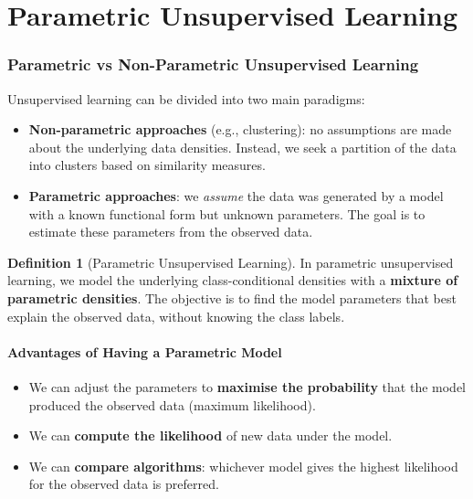 \documentclass[11pt,a4paper]{article}
\theoremstyle{definition}
\newtheorem{definition}{Definition}[section]
\theoremstyle{plain}
\theoremstyle{remark}
\begin{document}
\newpage
\part{Parametric Unsupervised Learning}

\section{Parametric vs Non-Parametric Unsupervised Learning}

Unsupervised learning can be divided into two main paradigms:

\begin{itemize}
    \item \textbf{Non-parametric approaches} (e.g., clustering): no assumptions are made about the underlying data densities. Instead, we seek a partition of the data into clusters based on similarity measures.
    \item \textbf{Parametric approaches}: we \emph{assume} the data was generated by a model with a known functional form but unknown parameters. The goal is to estimate these parameters from the observed data.
\end{itemize}

\begin{definition}[Parametric Unsupervised Learning]
In parametric unsupervised learning, we model the underlying class-conditional densities with a \textbf{mixture of parametric densities}. The objective is to find the model parameters that best explain the observed data, without knowing the class labels.
\end{definition}

\subsection{Advantages of Having a Parametric Model}

\begin{tcolorbox}[colback=green!5!white,colframe=green!75!black,title=\textbf{Why Use a Parametric Model?}]
\begin{itemize}
    \item We can adjust the parameters to \textbf{maximise the probability} that the model produced the observed data (maximum likelihood).
    \item We can \textbf{compute the likelihood} of new data under the model.
    \item We can \textbf{compare algorithms}: whichever model gives the highest likelihood for the observed data is preferred.
\end{itemize}
\end{tcolorbox}
\end{document}
